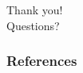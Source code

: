\documentclass{beamer}
\begin{document}
\begin{frame}
    \center
    \huge{Thank you!}\\
    \normalsize{Questions?}
\end{frame}



\begin{frame}
    \frametitle{References}

    
\end{frame}
\end{document}
